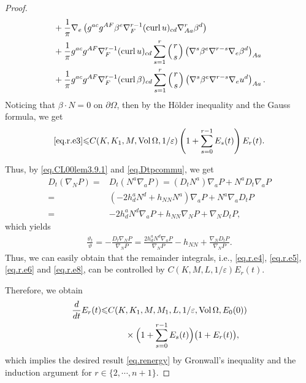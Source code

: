 \documentclass[12pt,reqno]{amsart}
\numberwithin{equation}{section}
\theoremstyle{definition}
\theoremstyle{remark}
\begin{document}
\begin{proof}
\begin{align*}
  &+\frac{1}{\pi}{\nabla}_e \left(g^{ac}g^{AF}\beta^e{\nabla}_F^{r-1}({\mathrm{curl}\,} u)_{cd}{\nabla}_{Aa}^r \beta^d\right)\\
  &+\frac{1}{\pi}g^{ac}g^{AF}{\nabla}_F^{r-1}({\mathrm{curl}\,} u)_{cd}\sum_{s=1}^r\left(r\atop s\right) \left({\nabla}^s\beta^e{\nabla}^{r-s}{\nabla}_e\beta^d\right)_{Aa}\\
  &+\frac{1}{\pi}g^{ac}g^{AF}{\nabla}_F^{r-1}({\mathrm{curl}\,} \beta)_{cd}\sum_{s=1}^r\left(r\atop s\right) \left({\nabla}^s\beta^e{\nabla}^{r-s}{\nabla}_e u^d\right)_{Aa}.
\end{align*}
Noticing that $\beta\cdot N=0$ on ${\partial}\Omega$, then by the H\"older inequality and the Gauss formula, we get
\begin{align}
  \eqref{eq.r.e3}{\leqslant} C(K,K_1,M,{\mathrm{Vol}\,}\Omega,1/{\varepsilon})\left(1+\sum_{s=0}^{r-1} E_s(t)\right)E_r(t).
\end{align}

  Thus, by \eqref{eq.CL00lem3.9.1} and \eqref{eq.Dtpcommu}, we get
  \begin{align*}
    D_t({\nabla}_N {P })=&D_t(N^a{\nabla}_a {P })=(D_t N^a){\nabla}_a {P }+N^aD_t{\nabla}_a {P }\\
    =&(-2h_d^a N^d+h_{NN} N^a){\nabla}_a {P }+N^a{\nabla}_a D_t{P }\\
    =&-2h_d^a N^d{\nabla}_a {P }+h_{NN}{\nabla}_N {P }+{\nabla}_N D_t{P },
  \end{align*}
  which yields
  \begin{align}
    \frac{\vartheta_t}{\vartheta}=-\frac{D_t{\nabla}_N {P }}{{\nabla}_N{P }}=\frac{2h_d^a N^d{\nabla}_a {P }}{{\nabla}_N{P }}-h_{NN}+\frac{{\nabla}_ND_t{P }}{{\nabla}_N{P }}.
  \end{align}
Thus, we can easily obtain that the remainder integrals, i.e., \eqref{eq.r.e4}, \eqref{eq.r.e5}, \eqref{eq.r.e6} and \eqref{eq.r.e8}, can be controlled by $C(K,M,L,1/{\varepsilon})E_r(t)$.

Therefore, we obtain
\begin{align}
  \frac{d}{dt}E_r(t){\leqslant} &C(K,K_1,M,M_1,L,1/{\varepsilon},{\mathrm{Vol}\,}\Omega,E_0(0)){\nonumber}\\
   &\qquad\times\Big(1+\sum_{s=0}^{r-1}E_s(t)\Big)\big(1+E_r(t)\big),
\end{align}
which implies the desired result \eqref{eq.renergy} by Gronwall's inequality and the induction argument for $r\in\{2,\cdots, n+1\}$.
\end{proof}
\end{document}
